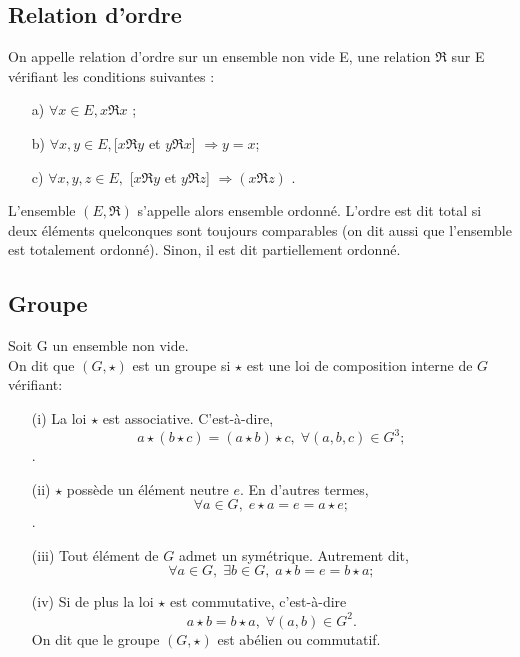 \subsection{Relation d'ordre}
\begin{madefinition}
	On appelle relation d’ordre sur un ensemble non vide E, une relation
	$\Re $ sur E vérifiant les conditions suivantes :
	\begin{enumerate}
		\item[a)] $\forall x \in E, x\Re x$ ;
		\item[b)] $\forall x,y \in E, $[$x\Re y $ et $y\Re x$] $ \Longrightarrow y = x $;
		\item[c)] $\forall x,y,z \in E,$ [$x\Re y$ et $y\Re z$] $\Longrightarrow (x\Re z)$  .
	\end{enumerate}
	L'ensemble $(E, \Re )$ s'appelle alors ensemble ordonné. L'ordre est dit total si deux éléments quelconques sont toujours comparables (on dit aussi que l'ensemble est totalement ordonné). Sinon, il est dit partiellement ordonné.
\end{madefinition}

\subsection{Groupe}
\begin{madefinition}
	Soit G un ensemble non vide.\\
	On dit que $(G, \star)$ est un groupe si $\star$ est une loi de composition interne de $G$ vérifiant:
	\begin{enumerate}
		\item[(i)] La loi $\star$ est associative. C’est-à-dire, 
		\[ a\star(b\star c) = (a\star b) \star c, \; \forall (a,b,c) \in G^3;\].
		\item[(ii)] $\star$ possède un élément neutre $e$. En d'autres termes,
		\[\forall a \in G, \; e\star a = e =  a\star e;\].
		\item[(iii)] Tout élément de $G$ admet un symétrique. Autrement dit,
		\[ \forall a \in G, \; \exists b \in G,\; a\star b = e = b \star a;\]
		\item [(iv)] Si de plus la loi $\star$ est commutative, c’est-à-dire
		\[ a\star b = b \star a, \; \forall (a,b) \in G^2.\]
		On dit que le groupe $(G,\star)$ est abélien ou commutatif.
	\end{enumerate}
\end{madefinition}
